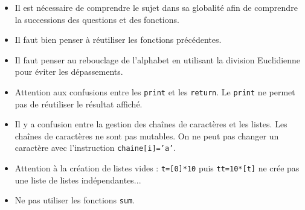 \begin{itemize}
\item Il est nécessaire de comprendre le sujet dans sa globalité afin de comprendre la successions des questions et des fonctions. 
\item Il faut bien penser à réutiliser les fonctions précédentes.
\item Il faut penser au rebouclage de l'alphabet en utilisant la division Euclidienne pour éviter les dépassements. 
\item Attention aux confusions entre les \texttt{print} et les \texttt{return}. Le \texttt{print} ne permet pas de réutiliser le résultat affiché.
\item Il y a confusion entre la gestion des chaînes de caractères et les listes. Les chaînes de caractères ne sont pas mutables. On ne peut pas changer un caractère avec l'instruction \texttt{chaine[i]='a'}. 
\item Attention à la création de listes vides :  \texttt{t=[0]*10} puis \texttt{tt=10*[t]} ne crée pas une liste de listes indépendantes...
\item Ne pas utiliser les fonctions \texttt{sum}.
\end{itemize}

